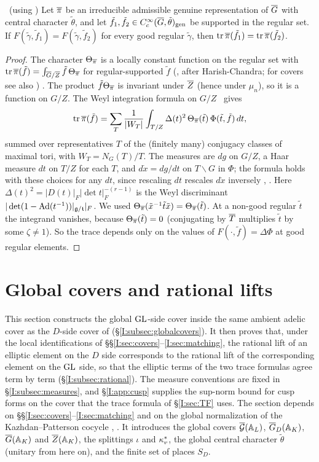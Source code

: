 \begin{lemma}\label{I:lem:traceOI}\ (using \Ev)
Let $\overline{\pi}$ be an irreducible admissible genuine representation of $\overline{G}$ with central character $\tilde\theta$, and let $\tilde f_1,\tilde f_2\in C_c^\infty(\overline{G},\tilde\theta)_{\mathrm{gen}}$ be supported in the regular set. If $F(\tilde\gamma,\tilde f_1)=F(\tilde\gamma,\tilde f_2)$ for every good regular $\tilde\gamma$, then $\operatorname{tr}\overline{\pi}(\tilde f_1)=\operatorname{tr}\overline{\pi}(\tilde f_2)$.
\end{lemma}
\begin{proof}
The character $\Theta_{\overline{\pi}}$ is a locally constant function on the regular set with $\operatorname{tr}\overline{\pi}(\tilde f)=\int_{\overline{G}/\overline{Z}}\tilde f\,\Theta_{\overline{\pi}}$ for regular-supported $\tilde f$ (\cite[\S13]{FK86}, after Harish-Chandra; for covers see also \cite{Li12}) \Ev. The product $\tilde f\Theta_{\overline{\pi}}$ is invariant under $\overline{Z}$ (hence under $\mu_n$), so it is a function on $G/Z$. The Weyl integration formula on $G/Z$ \cite{HC70} \Ev\ gives
\[ \operatorname{tr}\overline{\pi}(\tilde f)=\sum_{T}\frac1{|W_T|}\int_{T/Z}\Delta(t)^2\,\Theta_{\overline{\pi}}(\tilde t)\,\Phi(\tilde t,\tilde f)\,dt, \]
summed over representatives $T$ of the (finitely many) conjugacy classes of maximal tori, with $W_T=N_G(T)/T$. The measures are $dg$ on $G/Z$, a Haar measure $dt$ on $T/Z$ for each $T$, and $d\dot x=dg/dt$ on $T\backslash G$ in $\Phi$; the formula holds with these choices for any $dt$, since rescaling $dt$ rescales $d\dot x$ inversely \cite{HC70}, \cite[\S7]{Kot05}. Here $\Delta(t)^2=|D(t)|_F|\det t|_F^{-(r-1)}$ is the Weyl discriminant $|\det(1-\operatorname{Ad}(t^{-1}))|_{\mathfrak g/\mathfrak t}|_F$. We used $\Theta_{\overline{\pi}}(\tilde x^{-1}\tilde t\tilde x)=\Theta_{\overline{\pi}}(\tilde t)$. At a non-good regular $\tilde t$ the integrand vanishes, because $\Theta_{\overline{\pi}}(\tilde t)=0$ (conjugating by $\overline{T}$ multiplies $\tilde t$ by some $\zeta\ne1$). So the trace depends only on the values of $F(\cdot,\tilde f)=\Delta\Phi$ at good regular elements.
\end{proof}

\section{Global covers and rational lifts}\label{I:sec:global}
This section constructs the global $\mathrm{GL}$-side cover inside the same ambient adelic cover as the $D$-side cover of \cite{JC26a} (\S\ref{I:subsec:globalcovers}). It then proves that, under the local identifications of \S\S\ref{I:sec:covers}--\ref{I:sec:matching}, the rational lift of an elliptic element on the $D$ side corresponds to the rational lift of the corresponding element on the $\mathrm{GL}$ side, so that the elliptic terms of the two trace formulas agree term by term (\S\ref{I:subsec:rational}). The measure conventions are fixed in \S\ref{I:subsec:measures}, and \S\ref{I:app:cusp} supplies the sup-norm bound for cusp forms on the cover that the trace formula of \S\ref{I:sec:TF} uses. The section depends on \S\S\ref{I:sec:covers}--\ref{I:sec:matching} and on the global normalization of the Kazhdan--Patterson cocycle \cite[\S2]{FK86}, \cite[\S0.1]{KP84}. It introduces the global covers $\overline{\mathcal{G}}(\mathbb{A}_L)$, $\overline{G}_D(\mathbb{A}_K)$, $\overline{G}(\mathbb{A}_K)$ and $\overline{Z}(\mathbb{A}_K)$, the splittings $\iota$ and $\kappa^{*}_v$, the global central character $\tilde\theta$ (unitary from here on), and the finite set of places $S_D$.

